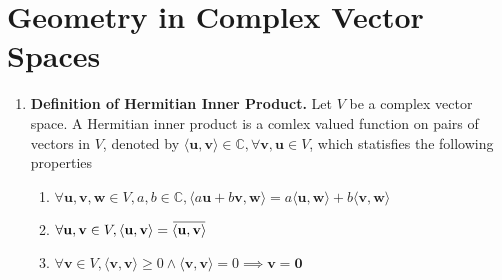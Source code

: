 \documentclass[oneside, 12pt]{book}
\newcommand{\settag}[1]{\renewcommand{\theenumi}{#1}}
\newcommand{\complex}{\mathbb{C}}
\newcommand{\tbf}[1]{\textbf{#1}}
\newcommand{\overbar}[1]{\mkern 1.5mu\overline{\mkern-1.5mu#1\mkern-1.5mu}\mkern 1.5mu}
\newcommand{\para}[1]{\item \tbf{#1}}
\newcommand{\vv}{\mathbf{v}}
\newcommand{\vu}{\mathbf{u}}
\newcommand{\vw}{\mathbf{w}}
\newcommand{\vzero}{\mathbf{0}}
\begin{document}
\section{Geometry in Complex Vector Spaces}
\begin{enumerate}
    \settag{5.3.1}
    \para{Definition of Hermitian Inner Product.} Let $V$ be a complex vector space. A Hermitian
    inner product is a comlex valued function on pairs of vectors in $V$, denoted by $\langle \vu, \vv\rangle\in \complex, \forall \vv,\vu \in V$,
    which statisfies the following properties
    \begin{enumerate}
        \item $\forall \vu, \vv, \vw\in V, a, b\in \complex, \langle a\vu+b\vv,\vw\rangle = a\langle \vu,\vw\rangle + b\langle \vv,\vw\rangle$
        \item $\forall \vu, \vv\in V, \langle \vu, \vv \rangle = \overbar{\langle \vu, \vv \rangle}$
        \item $\forall \vv\in V,\langle \vv,\vv \rangle \geq 0 \land \langle \vv,\vv\rangle =0 \implies \vv = \vzero$
    \end{enumerate}
\end{enumerate}
\end{document}
